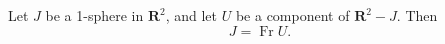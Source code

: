 Let $J$ be a 1-sphere in $\mathbf{R}^2$, and let $U$ be a component of $\mathbf{R}^2 - J$. Then
$$J = \operatorname{Fr} U.$$
